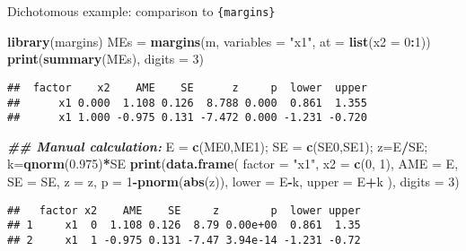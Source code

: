 \documentclass[
  ignorenonframetext,
]{beamer}
\newenvironment{Shaded}{\begin{snugshade}}{\end{snugshade}}
\newcommand{\AttributeTok}[1]{\textcolor[rgb]{0.13,0.29,0.53}{#1}}
\newcommand{\DecValTok}[1]{\textcolor[rgb]{0.00,0.00,0.81}{#1}}
\newcommand{\DocumentationTok}[1]{\textcolor[rgb]{0.56,0.35,0.01}{\textbf{\textit{#1}}}}
\newcommand{\FloatTok}[1]{\textcolor[rgb]{0.00,0.00,0.81}{#1}}
\newcommand{\FunctionTok}[1]{\textcolor[rgb]{0.13,0.29,0.53}{\textbf{#1}}}
\newcommand{\NormalTok}[1]{#1}
\newcommand{\OtherTok}[1]{\textcolor[rgb]{0.56,0.35,0.01}{#1}}
\newcommand{\SpecialCharTok}[1]{\textcolor[rgb]{0.81,0.36,0.00}{\textbf{#1}}}
\newcommand{\StringTok}[1]{\textcolor[rgb]{0.31,0.60,0.02}{#1}}
\begin{document}
\begin{frame}[fragile]{Dichotomous example: comparison to \texttt{\{margins\}}}
\protect\hypertarget{dichotomous-example-comparison-to-margins}{}
\begin{Shaded}
\begin{Highlighting}[]
\FunctionTok{library}\NormalTok{(margins)}
\NormalTok{MEs }\OtherTok{=} \FunctionTok{margins}\NormalTok{(m, }\AttributeTok{variables =} \StringTok{"x1"}\NormalTok{, }\AttributeTok{at =} \FunctionTok{list}\NormalTok{(}\AttributeTok{x2 =} \DecValTok{0}\SpecialCharTok{:}\DecValTok{1}\NormalTok{))}
\FunctionTok{print}\NormalTok{(}\FunctionTok{summary}\NormalTok{(MEs), }\AttributeTok{digits =} \DecValTok{3}\NormalTok{)}
\end{Highlighting}
\end{Shaded}

\begin{verbatim}
##  factor    x2    AME    SE      z     p  lower  upper
##      x1 0.000  1.108 0.126  8.788 0.000  0.861  1.355
##      x1 1.000 -0.975 0.131 -7.472 0.000 -1.231 -0.720
\end{verbatim}

\begin{Shaded}
\begin{Highlighting}[]
\DocumentationTok{\#\# Manual calculation:}
\NormalTok{E }\OtherTok{=} \FunctionTok{c}\NormalTok{(ME0,ME1); SE }\OtherTok{=} \FunctionTok{c}\NormalTok{(SE0,SE1); z}\OtherTok{=}\NormalTok{E}\SpecialCharTok{/}\NormalTok{SE; k}\OtherTok{=}\FunctionTok{qnorm}\NormalTok{(}\FloatTok{0.975}\NormalTok{)}\SpecialCharTok{*}\NormalTok{SE}
\FunctionTok{print}\NormalTok{(}\FunctionTok{data.frame}\NormalTok{(}
    \AttributeTok{factor =} \StringTok{"x1"}\NormalTok{, }\AttributeTok{x2 =} \FunctionTok{c}\NormalTok{(}\DecValTok{0}\NormalTok{, }\DecValTok{1}\NormalTok{), }\AttributeTok{AME =}\NormalTok{ E, }\AttributeTok{SE =}\NormalTok{ SE,}
    \AttributeTok{z =}\NormalTok{ z, }\AttributeTok{p =} \DecValTok{1}\SpecialCharTok{{-}}\FunctionTok{pnorm}\NormalTok{(}\FunctionTok{abs}\NormalTok{(z)), }\AttributeTok{lower =}\NormalTok{ E}\SpecialCharTok{{-}}\NormalTok{k, }\AttributeTok{upper =}\NormalTok{ E}\SpecialCharTok{+}\NormalTok{k}
\NormalTok{), }\AttributeTok{digits =} \DecValTok{3}\NormalTok{)}
\end{Highlighting}
\end{Shaded}

\begin{verbatim}
##   factor x2    AME    SE     z        p  lower upper
## 1     x1  0  1.108 0.126  8.79 0.00e+00  0.861  1.35
## 2     x1  1 -0.975 0.131 -7.47 3.94e-14 -1.231 -0.72
\end{verbatim}
\end{frame}
\end{document}
